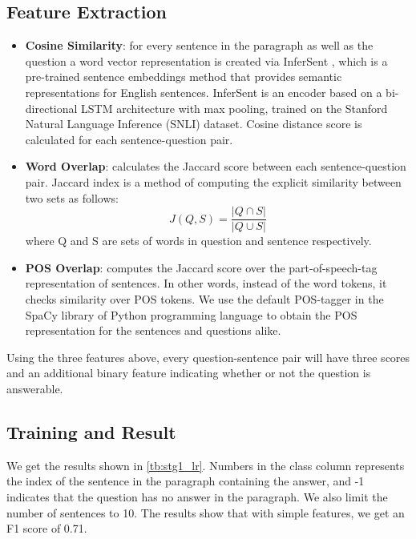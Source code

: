 \subsection{Feature Extraction} 
\begin{itemize}
\item \textbf{Cosine Similarity}: for every sentence in the paragraph as well as the question a word vector representation is created via InferSent \citep{ConneauKSBB17}, which is a pre-trained sentence embeddings method that provides semantic representations for English sentences. InferSent is an encoder based on a bi-directional LSTM architecture with max pooling, trained on the Stanford Natural Language Inference (SNLI) dataset. Cosine distance score is calculated for each sentence-question pair. 
\item \textbf{Word Overlap}: calculates the Jaccard score between each sentence-question pair. Jaccard index is a method of computing the explicit similarity between two sets as follows: 
$$
J(Q,S) = \frac{|Q \cap S|}{|Q \cup S|}
$$
where Q and S are sets of words in question and sentence respectively.

\item \textbf{POS Overlap}: computes the Jaccard score over the part-of-speech-tag representation of sentences. In other words, instead of the word tokens, it checks similarity over POS tokens. We use the default POS-tagger in the SpaCy library of Python programming language to obtain the POS representation for the sentences and questions alike.
\end{itemize}
Using the three features above, every question-sentence pair will have three scores and an additional binary feature indicating whether or not the question is answerable. 

\subsection{Training and Result} 
 We get the results shown in \ref{tb:stg1_lr}. Numbers in the class column represents the index of the sentence in the paragraph containing the answer, and -1 indicates that the question has no answer in the paragraph. We also limit the number of sentences to 10. The results show that with simple features, we get an F1 score of 0.71.

